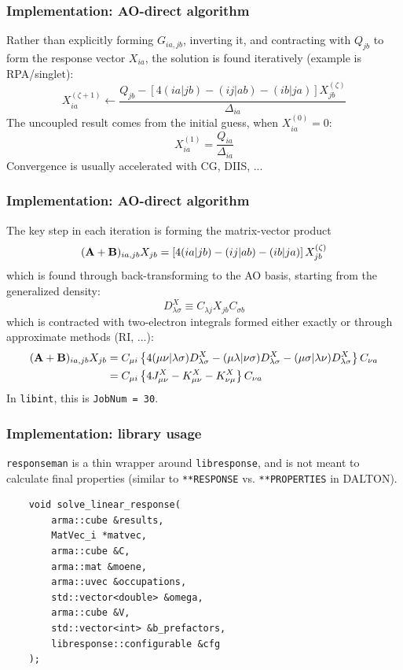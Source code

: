 \documentclass{beamer}
\begin{document}
\begin{frame}
  \frametitle{Implementation: AO-direct algorithm}
  Rather than explicitly forming \(G_{ia,jb}\), inverting it, and contracting with \(Q_{jb}\) to form the response vector \(X_{ia}\), the solution is found iteratively (example is RPA/singlet):
  \begin{equation*}
    X_{ia}^{(\zeta+1)} \leftarrow \frac{Q_{jb} - \left[4(ia|jb) - (ij|ab) - (ib|ja)\right] X_{jb}^{(\zeta)}}{\Delta_{ia}}
  \end{equation*}
  The uncoupled result comes from the initial guess, when \(X_{ia}^{(0)} = 0\):
  \begin{equation*}
    X_{ia}^{(1)} = \frac{Q_{ia}}{\Delta_{ia}}
  \end{equation*}
  Convergence is usually accelerated with CG, DIIS, ...
\end{frame}

\begin{frame}
  \frametitle{Implementation: AO-direct algorithm}
  \scriptsize
  The key step in each iteration is forming the matrix-vector product
  \begin{equation*}
    (\boldsymbol{\mathbf{A}}+\boldsymbol{\mathbf{B}})_{ia,jb}X_{jb} = \left[4(ia|jb) - (ij|ab) - (ib|ja)\right] X_{jb}^{(\zeta)}
  \end{equation*}
  which is found through back-transforming to the AO basis, starting from the generalized density:
  \begin{equation*}
    D_{\lambda\sigma}^{X} \equiv C_{\lambda j} X_{jb} C_{\sigma b}
  \end{equation*}
  which is contracted with two-electron integrals formed either exactly or through approximate methods (RI, ...):
  \begin{align*}
    (\boldsymbol{\mathbf{A}}+\boldsymbol{\mathbf{B}})_{ia,jb}X_{jb} &= C_{\mu i} \left\{ 4(\mu\nu|\lambda\sigma)D_{\lambda\sigma}^{X} - (\mu\lambda|\nu\sigma)D_{\lambda\sigma}^{X} - (\mu\sigma|\lambda\nu)D_{\lambda\sigma}^{X} \right\} C_{\nu a} \\
    &= C_{\mu i} \left\{ 4J_{\mu\nu}^{X} - K_{\mu\nu}^{X} - K_{\nu\mu}^{X} \right\} C_{\nu a}
  \end{align*}
  In \texttt{libint}, this is \texttt{JobNum = 30}.
\end{frame}

\begin{frame}[fragile]
  \frametitle{Implementation: library usage}
  \texttt{responseman} is a thin wrapper around \texttt{libresponse}, and is not meant to calculate final properties (similar to \texttt{**RESPONSE} vs. \texttt{**PROPERTIES} in DALTON). \\
  \begin{verbatim}
    void solve_linear_response(
        arma::cube &results,
        MatVec_i *matvec,
        arma::cube &C,
        arma::mat &moene,
        arma::uvec &occupations,
        std::vector<double> &omega,
        arma::cube &V,
        std::vector<int> &b_prefactors,
        libresponse::configurable &cfg
    );
  \end{verbatim}
\end{frame}
\end{document}
